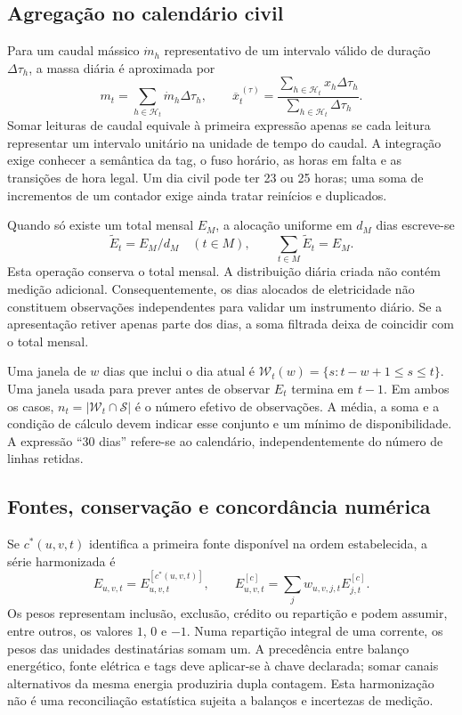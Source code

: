 \subsection{Agregação no calendário civil}
\label{sec:mat-agregacao}
Para um caudal mássico $\dot m_h$ representativo de um intervalo válido de duração $\Delta\tau_h$, a massa diária é aproximada por
\begin{equation}
m_t=\sum_{h\in\mathcal H_t}\dot m_h\Delta\tau_h,
\qquad \overline x_t^{\,(\tau)}=
\frac{\sum_{h\in\mathcal H_t}x_h\Delta\tau_h}{\sum_{h\in\mathcal H_t}\Delta\tau_h}.
\label{eq:mat-integracao}
\end{equation}
Somar leituras de caudal equivale à primeira expressão apenas se cada leitura representar um intervalo unitário na unidade de tempo do caudal. A integração exige conhecer a semântica da tag, o fuso horário, as horas em falta e as transições de hora legal. Um dia civil pode ter 23 ou 25 horas; uma soma de incrementos de um contador exige ainda tratar reinícios e duplicados.

Quando só existe um total mensal $E_M$, a alocação uniforme em $d_M$ dias escreve-se
\begin{equation}
\widetilde E_t=E_M/d_M\quad(t\in M),
\qquad \sum_{t\in M}\widetilde E_t=E_M.
\label{eq:mat-alocacao-mensal}
\end{equation}
Esta operação conserva o total mensal. A distribuição diária criada não contém medição adicional. Consequentemente, os dias alocados de eletricidade não constituem observações independentes para validar um instrumento diário. Se a apresentação retiver apenas parte dos dias, a soma filtrada deixa de coincidir com o total mensal.

Uma janela de $w$ dias que inclui o dia atual é $\mathcal W_t(w)=\{s:t-w+1\leq s\leq t\}$. Uma janela usada para prever antes de observar $E_t$ termina em $t-1$. Em ambos os casos, $n_t=|\mathcal W_t\cap\mathcal S|$ é o número efetivo de observações. A média, a soma e a condição de cálculo devem indicar esse conjunto e um mínimo de disponibilidade. A expressão ``30 dias'' refere-se ao calendário, independentemente do número de linhas retidas.

\subsection{Fontes, conservação e concordância numérica}
\label{sec:mat-concordancia}
Se $c^*(u,v,t)$ identifica a primeira fonte disponível na ordem estabelecida, a série harmonizada é
\begin{equation}
E_{u,v,t}=E^{[c^*(u,v,t)]}_{u,v,t},
\qquad E^{[c]}_{u,v,t}=\sum_j w_{u,v,j,t}E^{[c]}_{j,t}.
\label{eq:mat-fontes}
\end{equation}
Os pesos representam inclusão, exclusão, crédito ou repartição e podem assumir, entre outros, os valores $1$, $0$ e $-1$. Numa repartição integral de uma corrente, os pesos das unidades destinatárias somam um. A precedência entre balanço energético, fonte elétrica e tags deve aplicar-se à chave declarada; somar canais alternativos da mesma energia produziria dupla contagem. Esta harmonização não é uma reconciliação estatística sujeita a balanços e incertezas de medição.

